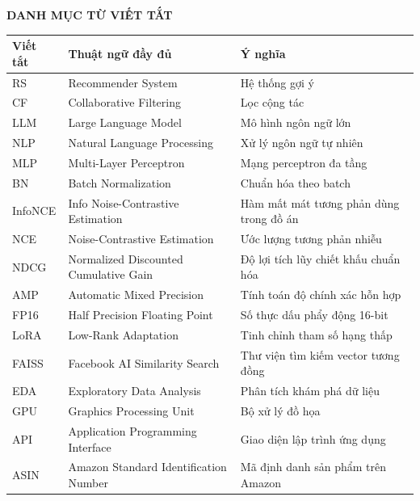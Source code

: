 \clearpage
\thispagestyle{plain}
\vspace*{0.2cm}
\begin{center}
    {\LARGE\textbf{\MakeUppercase{Danh mục từ viết tắt}}}
\end{center}
\vspace{0.35cm}

{\small
\renewcommand{\arraystretch}{1.18}
\noindent\begin{tabularx}{\textwidth}{@{}l l X@{}}
\toprule
\textbf{Viết tắt} & \textbf{Thuật ngữ đầy đủ} & \textbf{Ý nghĩa} \\
\midrule
RS       & Recommender System            & Hệ thống gợi ý \\
CF       & Collaborative Filtering       & Lọc cộng tác \\
LLM      & Large Language Model          & Mô hình ngôn ngữ lớn \\
NLP      & Natural Language Processing    & Xử lý ngôn ngữ tự nhiên \\
MLP      & Multi-Layer Perceptron        & Mạng perceptron đa tầng \\
BN       & Batch Normalization           & Chuẩn hóa theo batch \\
InfoNCE  & Info Noise-Contrastive Estimation & Hàm mất mát tương phản dùng trong đồ án \\
NCE      & Noise-Contrastive Estimation  & Ước lượng tương phản nhiễu \\
NDCG     & Normalized Discounted Cumulative Gain & Độ lợi tích lũy chiết khấu chuẩn hóa \\
AMP      & Automatic Mixed Precision     & Tính toán độ chính xác hỗn hợp \\
FP16     & Half Precision Floating Point & Số thực dấu phẩy động 16-bit \\
LoRA     & Low-Rank Adaptation           & Tinh chỉnh tham số hạng thấp \\
FAISS    & Facebook AI Similarity Search & Thư viện tìm kiếm vector tương đồng \\
EDA      & Exploratory Data Analysis     & Phân tích khám phá dữ liệu \\
GPU      & Graphics Processing Unit      & Bộ xử lý đồ họa \\
API      & Application Programming Interface & Giao diện lập trình ứng dụng \\
ASIN     & Amazon Standard Identification Number & Mã định danh sản phẩm trên Amazon \\
\bottomrule
\end{tabularx}
}
